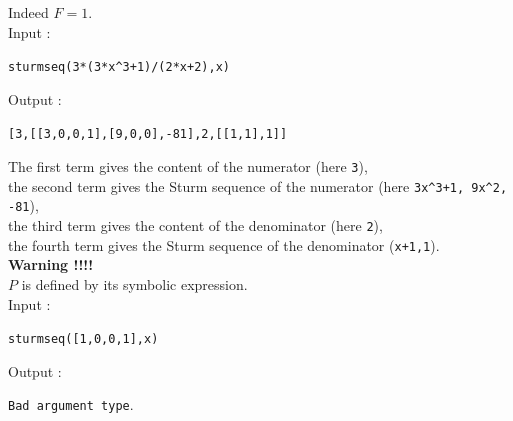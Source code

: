 \documentclass[a4paper,11pt]{book}
\begin{document}
Indeed $F=1$.\\
Input :
\begin{center}{\tt sturmseq(3*(3*x\verb|^|3+1)/(2*x+2),x)}\end{center}
Output :
\begin{center}{\tt[3,[[3,0,0,1],[9,0,0],-81],2,[[1,1],1]]}\end{center}
The first term gives the content of the numerator 
(here {\tt 3}),\\
the second term gives the Sturm sequence of the numerator
(here {\tt 3x\verb|^|3+1, 9x\verb|^|2, -81}),\\
the third term gives the content of the denominator (here 
{\tt 2}),\\
the fourth  term gives the Sturm sequence of the denominator 
({\tt x+1,1}).\\
{\bf Warning !!!!}\\
$P$ is defined by its symbolic expression.\\
Input  :
\begin{center}
{\tt sturmseq([1,0,0,1],x)}
\end{center}
Output :
\begin{center}
{\tt Bad argument type}.
\end{center}
\end{document}
